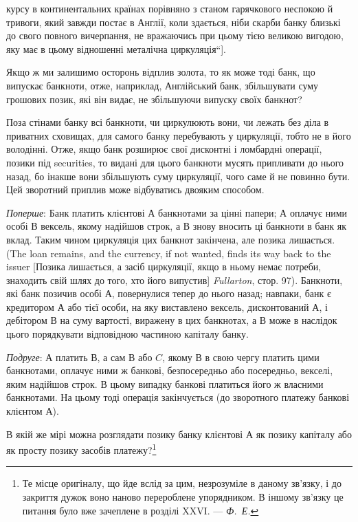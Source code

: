 \parcont{}  %
курсу в континентальних країнах порівняно з станом гарячкового
неспокою й тривоги, який завжди постає в Англії, коли
здається, ніби скарби банку близькі до свого повного вичерпання,
не вражаючись при цьому тією великою вигодою, яку
має в цьому відношенні металічна циркуляція“].

Якщо ж ми залишимо осторонь відплив золота, то як може
тоді банк, що випускає банкноти, отже, наприклад, Англійський
банк, збільшувати суму грошових позик, які він видає, не збільшуючи
випуску своїх банкнот?

Поза стінами банку всі банкноти, чи циркулюють вони, чи
лежать без діла в приватних сховищах, для самого банку перебувають
у циркуляції, тобто не в його володінні. Отже, якщо
банк розширює свої дисконтні і ломбардні операції, позики під
securities, то видані для цього банкноти мусять припливати до
нього назад, бо інакше вони збільшують суму циркуляції, чого
саме й не повинно бути. Цей зворотний приплив може відбуватись
двояким способом.

\emph{Поперше}: Банк платить клієнтові $А$ банкнотами за цінні папери;
$А$ оплачує ними особі $В$ вексель, якому надійшов строк,
а $В$ знову вносить ці банкноти в банк як вклад. Таким чином
циркуляція цих банкнот закінчена, але позика лишається. (The
loan remains, and the currency, if not wanted, finds its way back
to the issuer [Позика лишається, а засіб циркуляції, якщо в ньому
немає потреби, знаходить свій шлях до того, хто його випустив]
\emph{Fullarton}, стор. 97). Банкноти, які банк позичив особі $А$, повернулися
тепер до нього назад; навпаки, банк є кредитором $А$
або тієї особи, на яку виставлено вексель, дисконтований $А$,
і дебітором $В$ на суму вартості, виражену в цих банкнотах,
а $В$ може в наслідок цього порядкувати відповідною частиною
капіталу банку.

\emph{Подруге}: $А$ платить $В$, а сам $В$ або $C$, якому $В$ в свою чергу
платить цими банкнотами, оплачує ними ж банкові, безпосередньо
або посередньо, векселі, яким надійшов строк. В цьому
випадку банкові платиться його ж власними банкнотами. На
цьому тоді операція закінчується (до зворотного платежу банкові
клієнтом $А$).

В якій же мірі можна розглядати позику банку клієнтові $А$
як позику капіталу або як просту позику засобів платежу?\footnote{
Те місце оригіналу, що йде вслід за цим, незрозуміле в даному зв’язку,
і до закриття дужок воно наново перероблене упорядником. В іншому зв’язку
це питання було вже зачеплене в розділі XXVI. — \emph{Ф.~Е.}
}

